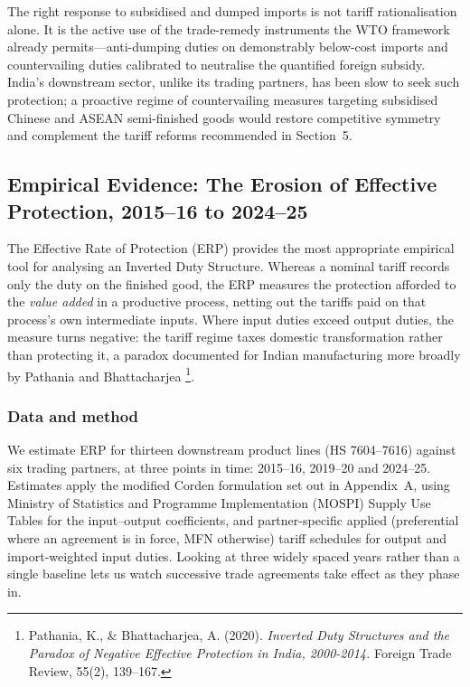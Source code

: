 \documentclass[11pt, a4paper]{article}
\numberwithin{figure}{section}
\numberwithin{table}{section}
\begin{document}
The right response to subsidised and dumped imports is not tariff rationalisation alone. It is the active use of the trade-remedy instruments the WTO framework already permits—anti-dumping duties on demonstrably below-cost imports and countervailing duties calibrated to neutralise the quantified foreign subsidy. India's downstream sector, unlike its trading partners, has been slow to seek such protection; a proactive regime of countervailing measures targeting subsidised Chinese and ASEAN semi-finished goods would restore competitive symmetry and complement the tariff reforms recommended in Section~5.

\subsection{Empirical Evidence: The Erosion of Effective Protection, 2015--16 to 2024--25}
The Effective Rate of Protection (ERP) provides the most appropriate empirical tool for analysing an Inverted Duty Structure. Whereas a nominal tariff records only the duty on the finished good, the ERP measures the protection afforded to the \emph{value added} in a productive process, netting out the tariffs paid on that process's own intermediate inputs. Where input duties exceed output duties, the measure turns negative: the tariff regime taxes domestic transformation rather than protecting it, a paradox documented for Indian manufacturing more broadly by Pathania and Bhattacharjea \cite{pathania2020}\footnote{Pathania, K., \& Bhattacharjea, A. (2020). \textit{Inverted Duty Structures and the Paradox of Negative Effective Protection in India, 2000-2014.} Foreign Trade Review, 55(2), 139--167.}.

\subsubsection*{Data and method}
We estimate ERP for thirteen downstream product lines (HS 7604--7616) against six trading partners, at three points in time: 2015--16, 2019--20 and 2024--25. Estimates apply the modified Corden formulation set out in Appendix~A, using Ministry of Statistics and Programme Implementation (MOSPI) Supply Use Tables for the input--output coefficients, and partner-specific applied (preferential where an agreement is in force, MFN otherwise) tariff schedules for output and import-weighted input duties. Looking at three widely spaced years rather than a single baseline lets us watch successive trade agreements take effect as they phase in.
\end{document}

